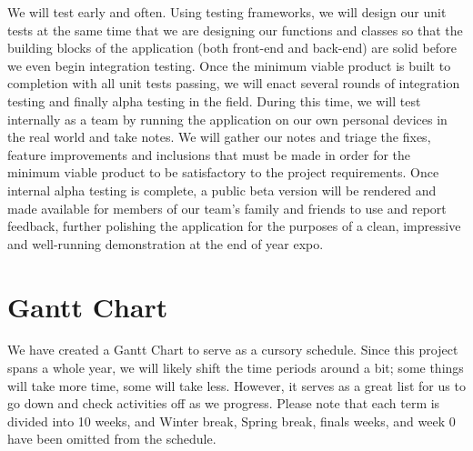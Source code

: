 \documentclass[draftclsnofoot, onecolumn,journal,letterpaper,10pt, compsoc]{IEEEtran}
\begin{document}
We will test early and often. Using testing frameworks, we will design our unit tests at the same time that we are designing our functions and classes so that the building blocks of the application (both front-end and back-end) are solid before we even begin integration testing. Once the minimum viable product is built to completion with all unit tests passing, we will enact several rounds of integration testing and finally alpha testing in the field. During this time, we will test internally as a team by running the application on our own personal devices in the real world and take notes. We will gather our notes and triage the fixes, feature improvements and inclusions that must be made in order for the minimum viable product to be satisfactory to the project requirements. Once internal alpha testing is complete, a public beta version will be rendered and made available for members of our team's family and friends to use and report feedback, further polishing the application for the purposes of a clean, impressive and well-running demonstration at the end of year expo.

\pagebreak

\section{Gantt Chart}
We have created a Gantt Chart to serve as a cursory schedule. Since this project spans a whole year, we will likely shift the time periods around a bit; some things will take more time, some will take less. However, it serves as a great list for us to go down and check activities off as we progress. Please note that each term is divided into 10 weeks, and Winter break, Spring break, finals weeks, and week 0 have been omitted from the schedule.
\end{document}
